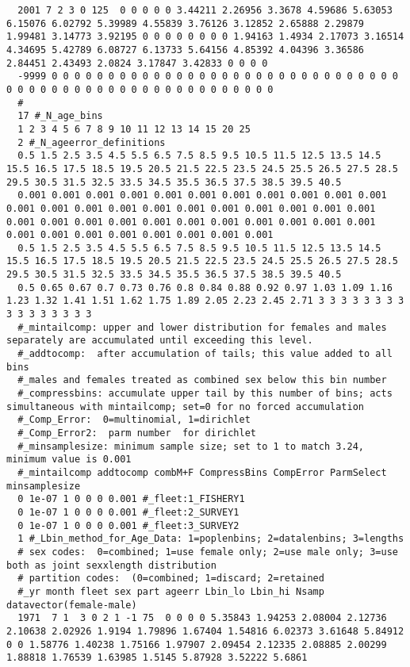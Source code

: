 \begin{landscape}
{\begin{verbatim}
  2001 7 2 3 0 125  0 0 0 0 0 3.44211 2.26956 3.3678 4.59686 5.63053 6.15076 6.02792 5.39989 4.55839 3.76126 3.12852 2.65888 2.29879 1.99481 3.14773 3.92195 0 0 0 0 0 0 0 0 1.94163 1.4934 2.17073 3.16514 4.34695 5.42789 6.08727 6.13733 5.64156 4.85392 4.04396 3.36586  2.84451 2.43493 2.0824 3.17847 3.42833 0 0 0 0
  -9999 0 0 0 0 0 0 0 0 0 0 0 0 0 0 0 0 0 0 0 0 0 0 0 0 0 0 0 0 0 0 0 0 0 0 0 0 0 0 0 0 0 0 0 0 0 0 0 0 0 0 0 0 0 0 0 
  #
  17 #_N_age_bins
  1 2 3 4 5 6 7 8 9 10 11 12 13 14 15 20 25
  2 #_N_ageerror_definitions
  0.5 1.5 2.5 3.5 4.5 5.5 6.5 7.5 8.5 9.5 10.5 11.5 12.5 13.5 14.5 15.5 16.5 17.5 18.5 19.5 20.5 21.5 22.5 23.5 24.5 25.5 26.5 27.5 28.5 29.5 30.5 31.5 32.5 33.5 34.5 35.5 36.5 37.5 38.5 39.5 40.5
  0.001 0.001 0.001 0.001 0.001 0.001 0.001 0.001 0.001 0.001 0.001 0.001 0.001 0.001 0.001 0.001 0.001 0.001 0.001 0.001 0.001 0.001 0.001 0.001 0.001 0.001 0.001 0.001 0.001 0.001 0.001 0.001 0.001 0.001 0.001 0.001 0.001 0.001 0.001 0.001 0.001
  0.5 1.5 2.5 3.5 4.5 5.5 6.5 7.5 8.5 9.5 10.5 11.5 12.5 13.5 14.5 15.5 16.5 17.5 18.5 19.5 20.5 21.5 22.5 23.5 24.5 25.5 26.5 27.5 28.5 29.5 30.5 31.5 32.5 33.5 34.5 35.5 36.5 37.5 38.5 39.5 40.5
  0.5 0.65 0.67 0.7 0.73 0.76 0.8 0.84 0.88 0.92 0.97 1.03 1.09 1.16 1.23 1.32 1.41 1.51 1.62 1.75 1.89 2.05 2.23 2.45 2.71 3 3 3 3 3 3 3 3 3 3 3 3 3 3 3 3
  #_mintailcomp: upper and lower distribution for females and males separately are accumulated until exceeding this level.
  #_addtocomp:  after accumulation of tails; this value added to all bins
  #_males and females treated as combined sex below this bin number 
  #_compressbins: accumulate upper tail by this number of bins; acts simultaneous with mintailcomp; set=0 for no forced accumulation
  #_Comp_Error:  0=multinomial, 1=dirichlet
  #_Comp_Error2:  parm number  for dirichlet
  #_minsamplesize: minimum sample size; set to 1 to match 3.24, minimum value is 0.001
  #_mintailcomp addtocomp combM+F CompressBins CompError ParmSelect minsamplesize
  0 1e-07 1 0 0 0 0.001 #_fleet:1_FISHERY1
  0 1e-07 1 0 0 0 0.001 #_fleet:2_SURVEY1
  0 1e-07 1 0 0 0 0.001 #_fleet:3_SURVEY2
  1 #_Lbin_method_for_Age_Data: 1=poplenbins; 2=datalenbins; 3=lengths
  # sex codes:  0=combined; 1=use female only; 2=use male only; 3=use both as joint sexxlength distribution
  # partition codes:  (0=combined; 1=discard; 2=retained
  #_yr month fleet sex part ageerr Lbin_lo Lbin_hi Nsamp datavector(female-male)
  1971  7 1  3 0 2 1 -1 75  0 0 0 0 5.35843 1.94253 2.08004 2.12736 2.10638 2.02926 1.9194 1.79896 1.67404 1.54816 6.02373 3.61648 5.84912 0 0 1.58776 1.40238 1.75166 1.97907 2.09454 2.12335 2.08885 2.00299 1.88818 1.76539 1.63985 1.5145 5.87928 3.52222 5.6861

\end{verbatim}}
\end{landscape}
